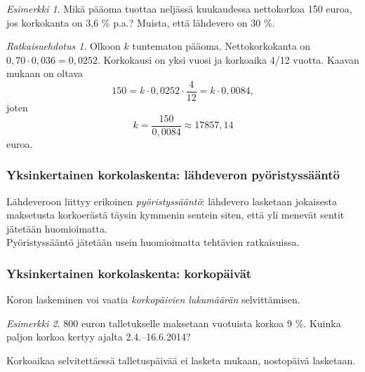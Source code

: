 \documentclass[]{beamer}\usepackage[]{graphicx}\usepackage[]{color}
\theoremstyle{remark}
\newtheorem{esim}{Esimerkki}
\newtheorem{ratkaisu}{Ratkaisuehdotus}
\newcommand{\pblock}{\\ \vspace{0.5cm}\pause}
\begin{document}
\begin{frame}
    \begin{esim}
        Mikä pääoma tuottaa neljässä kuukaudessa nettokorkoa 150 euroa, jos korkokanta on 3{,}6 \% p.a.? Muista, että lähdevero on 30 \%.
    \end{esim}\pause
    \begin{ratkaisu}
        Olkoon \(k\) tuntematon pääoma. \pause Nettokorkokanta on \(0,70\cdot0,036 = 0,0252\).
        \pause Korkokausi on yksi vuosi ja korkoaika 4/12 vuotta.
        \pause Kaavan mukaan on oltava
        \[
            150 = k\cdot 0,0252\cdot \frac{4}{12} = k\cdot 0,0084,
        \]
        \pause
        joten
        \[
            k = \frac{150}{0,0084}\approx 17857,14
        \]
        euroa.
    \end{ratkaisu}
\end{frame}

\begin{frame}
    \frametitle{Yksinkertainen korkolaskenta: lähdeveron pyöristyssääntö}
    \pause
    \pause
    Lähdeveroon liittyy erikoinen \emph{pyöristyssääntö}:
    lähdevero lasketaan jokaisesta maksetusta korkoerästä täysin kymmenin sentein siten,
    että yli menevät sentit jätetään huomioimatta.
    \pblock
    Pyöristyssääntö jätetään usein huomioimatta tehtävien ratkaisuissa.
\end{frame}

\begin{frame}
    \frametitle{Yksinkertainen korkolaskenta: korkopäivät}
    \pause
    Koron laskeminen voi vaatia \emph{korkopäivien lukumäärän} selvittämisen.
    \pause
    \begin{esim}
        800 euron talletukselle maksetaan vuotuista korkoa 9 \%. Kuinka paljon korkoa kertyy ajalta 2.4.--16.6.2014?
    \end{esim}
    \pause
    Korkoaikaa selvitettäessä talletuspäivää ei lasketa mukaan, nostopäivä lasketaan.
\end{frame}
\end{document}
